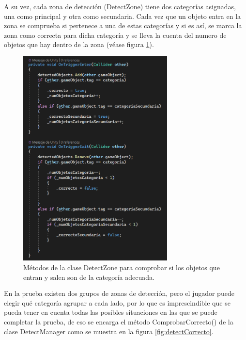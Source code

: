 A su vez, cada zona de detección (DetectZone) tiene dos categorías asignadas, una como principal y otra como secundaria. Cada vez que un objeto entra en la zona se comprueba si pertenece a una de estas categorías y si es así, se marca la zona como correcta para dicha categoría y se lleva la cuenta del numero de objetos que hay dentro de la zona (véase figura \ref{fig:detectZoneTriggers}). 



\begin{figure}
	\centering
	\includegraphics[width=0.7\textwidth]{04.Desarrollo/05.Entrega5/01.Iteracion5_1/00.Figuras/22.detect_zone_triggers.png}
	\caption{Métodos de la clase DetectZone para comprobar si los objetos que entran y salen son de la categoría adecuada.}
	\label{fig:detectZoneTriggers}
\end{figure}


En la prueba existen dos grupos de zonas de detección, pero el jugador puede elegir qué categoría agrupar a cada lado, por lo que es imprescindible que se pueda tener en cuenta todas las posibles situaciones en las que se puede completar la prueba, de eso se encarga el método ComprobarCorrecto() de la clase DetectManager como se muestra en la figura \ref{fig:detectCorrecto}.




